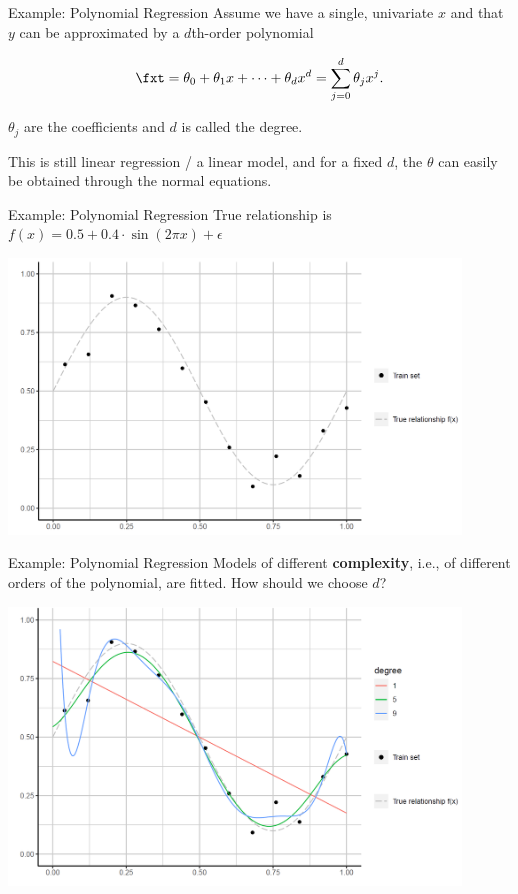 \begin{frame}{Example: Polynomial Regression}
Assume we have a single, univariate \(x\) and that \(y\) can be
approximated by a \(d\)th-order polynomial

\[ \fxt = \theta_0 + \theta_1 x + \cdots + \theta_d x^d = \sum_{j = 0}^{d} \theta_j x^j\text{.} \]

\(\theta_j\) are the coefficients and \(d\) is called the degree.

This is still linear regression / a linear model, and for a fixed \(d\),
the \(\theta\) can easily be obtained through the normal equations.
\end{frame}



\begin{frame}{Example: Polynomial Regression}
True relationship is
\(f(x) = 0.5 + 0.4 \cdot \sin (2 \pi x) + \epsilon\)

\scriptsize

\begin{center}
\includegraphics[width=0.9\textwidth]{plots/poly-reg01.png}
\end{center}

\normalsize 
\end{frame}


\begin{frame}{Example: Polynomial Regression}
Models of different \textbf{complexity}, i.e., of different orders of the
polynomial, are fitted. How should we choose \(d\)?

\scriptsize

\begin{center}
\includegraphics[width=0.9\textwidth]{plots/poly-reg02.png}
\end{center}
\normalsize 
\end{frame}


